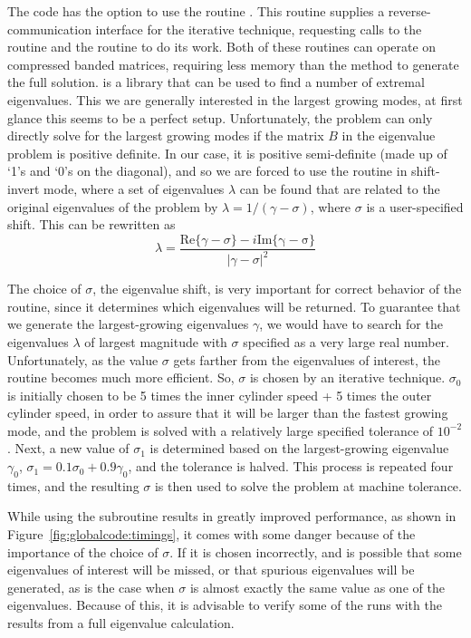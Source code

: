 \documentclass[letterpaper]{article}
\begin{document}
The code has the option to use the \verb@ARPACK@ routine
\verb@ZNAUPD@. This routine supplies a reverse-communication interface
for the iterative technique, requesting calls to the \verb@BLAS@
routine \verb@ZGBMV@ and the \verb@LAPACK@ routine \verb@ZGBTRS@ to do
its work. Both of these routines can operate on compressed banded
matrices, requiring less memory than the method to generate the full
solution. \verb@ARPACK@ is a library that can be used to find a
number of extremal eigenvalues. This we are generally interested in
the largest growing modes, at first glance this seems to be a perfect
setup. Unfortunately, the \verb@ZNAUPD@ problem can only directly
solve for the largest growing modes if the matrix $B$ in the
eigenvalue problem is positive definite. In our case, it is positive
semi-definite (made up of `1's and `0's on the diagonal), and so we
are forced to use the routine in shift-invert mode, where a set of
eigenvalues $\lambda$ can be found that are related to the original
eigenvalues of the problem by $\lambda = 1/(\gamma-\sigma)$, where
$\sigma$ is a user-specified shift. This can be rewritten as
\begin{equation}
\lambda = \frac{\mathrm{Re}\{\gamma-\sigma\} - i\mathrm{Im\{\gamma-\sigma\}}}
               {|\gamma-\sigma|^2}
\end{equation}

The choice of $\sigma$, the eigenvalue shift, is very important for
correct behavior of the \verb@ARPACK@ routine, since it determines
which eigenvalues will be returned. To guarantee that we generate the
largest-growing eigenvalues $\gamma$, we would have to search for the
eigenvalues $\lambda$ of largest magnitude with $\sigma$ specified as
a very large real number. Unfortunately, as the value $\sigma$ gets
farther from the eigenvalues of interest, the routine becomes much
more efficient. So, $\sigma$ is chosen by an iterative technique.
$\sigma_0$ is initially chosen to be 5 times the inner cylinder speed
+ 5 times the outer cylinder speed, in order to assure that it will be
larger than the fastest growing mode, and the problem is solved with a
relatively large specified tolerance of $10^{-2}$. Next, a new value
of $\sigma_1$ is determined based on the largest-growing eigenvalue
$\gamma_0$, $\sigma_1 = 0.1\sigma_0 + 0.9\gamma_0$, and the
tolerance is halved. This process is repeated four times, and the
resulting $\sigma$ is then used to solve the problem at machine
tolerance.

While using the \verb@ARPACK@ subroutine results in greatly improved
performance, as shown in Figure~\ref{fig:globalcode:timings}, it comes
with some danger because of the importance of the choice of
$\sigma$. If it is chosen incorrectly, and is possible that some
eigenvalues of interest will be missed, or that spurious eigenvalues
will be generated, as is the case when $\sigma$ is almost exactly the
same value as one of the eigenvalues. Because of this, it is advisable
to verify some of the runs with the results from a full eigenvalue
calculation.
\end{document}
